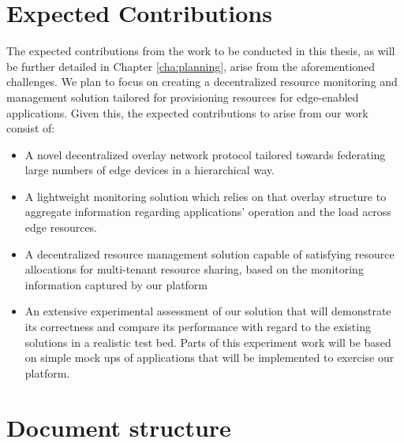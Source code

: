 \section{Expected Contributions}

The expected contributions from the work to be conducted in this thesis, as will be further detailed in Chapter \ref{cha:planning}, arise from the aforementioned challenges. We plan to focus on creating a decentralized resource monitoring and management solution tailored for provisioning resources for edge-enabled applications. Given this, the expected contributions to arise from our work consist of: 

\begin{itemize}

    \item A novel decentralized overlay network protocol tailored towards federating large numbers of edge devices in a hierarchical way.
    
    \item A lightweight monitoring solution which relies on that overlay structure to aggregate information regarding applications’ operation and the load across edge resources.
    
    \item A decentralized resource management solution capable of satisfying resource allocations for multi-tenant resource sharing, based on the monitoring information captured by our platform
    
    \item An extensive experimental assessment of our solution that will demonstrate its correctness and compare its performance with regard to the existing solutions in a realistic test bed. Parts of this experiment work will be based on simple mock ups of applications that will be implemented to exercise our platform.



    
\end{itemize}

\section{Document structure}

